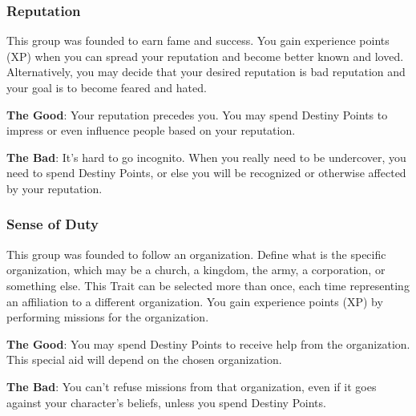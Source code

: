 \begin{multicols}{2}
\subsubsection{Reputation}
This group was founded to earn fame and success. You gain experience points (XP) when you can spread your reputation and become better known and loved. Alternatively, you may decide that your desired reputation is bad reputation and your goal is to become feared and hated.

\textbf{The Good}: Your reputation precedes you. You may spend Destiny Points to impress or even influence people based on your reputation.

\textbf{The Bad}: It's hard to go incognito. When you really need to be undercover, you need to spend Destiny Points, or else you will be recognized or otherwise affected by your reputation.

\subsubsection{Sense of Duty}
This group was founded to follow an organization. Define what is the specific organization, which may be a church, a kingdom, the army, a corporation, or something else. This Trait can be selected more than once, each time representing an affiliation to a different organization. You gain experience points (XP) by performing missions for the organization.

\textbf{The Good}: You may spend Destiny Points to receive help from the organization. This special aid will depend on the chosen organization.

\textbf{The Bad}: You can’t refuse missions from that organization, even if it goes against your character’s beliefs, unless you spend Destiny Points.
\end{multicols}
\clearpage
